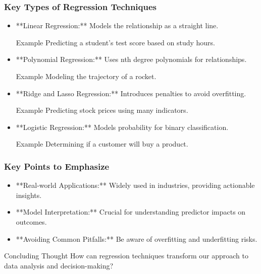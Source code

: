 \documentclass[aspectratio=169]{beamer}
\begin{document}
\begin{frame}[fragile]
    \frametitle{Key Types of Regression Techniques}
    \begin{itemize}
        \item **Linear Regression:** Models the relationship as a straight line.
        \begin{block}{Example}
            Predicting a student's test score based on study hours.
        \end{block}
        
        \item **Polynomial Regression:** Uses nth degree polynomials for relationships.
        \begin{block}{Example}
            Modeling the trajectory of a rocket.
        \end{block}
        
        \item **Ridge and Lasso Regression:** Introduces penalties to avoid overfitting.
        \begin{block}{Example}
            Predicting stock prices using many indicators.
        \end{block}
        
        \item **Logistic Regression:** Models probability for binary classification.
        \begin{block}{Example}
            Determining if a customer will buy a product.
        \end{block}
    \end{itemize}
\end{frame}

\begin{frame}[fragile]
    \frametitle{Key Points to Emphasize}
    \begin{itemize}
        \item **Real-world Applications:** Widely used in industries, providing actionable insights.
        \item **Model Interpretation:** Crucial for understanding predictor impacts on outcomes.
        \item **Avoiding Common Pitfalls:** Be aware of overfitting and underfitting risks.
    \end{itemize}

    \begin{block}{Concluding Thought}
        How can regression techniques transform our approach to data analysis and decision-making?
    \end{block}
\end{frame}
\end{document}
